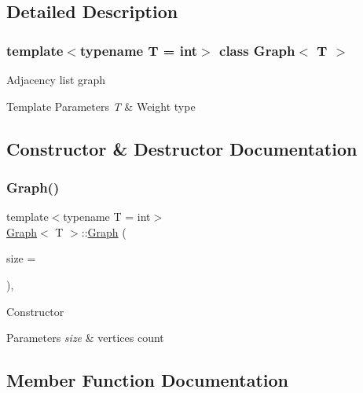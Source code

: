 \subsection{Detailed Description}
\subsubsection*{template$<$typename T = int$>$\newline
class Graph$<$ T $>$}

Adjacency list graph 
\begin{DoxyTemplParams}{Template Parameters}
{\em T} & Weight type \\
\hline
\end{DoxyTemplParams}


\subsection{Constructor \& Destructor Documentation}
\mbox{\label{class_graph_ae4d33378f071400af20f374d03a2ae17}} 
\subsubsection{\texorpdfstring{Graph()}{Graph()}}
{\footnotesize\ttfamily template$<$typename T = int$>$ \\
\hyperlink{class_graph}{Graph}$<$ T $>$\+::\hyperlink{class_graph}{Graph} (\begin{DoxyParamCaption}\item[{size\+\_\+t}]{size = {} }\end{DoxyParamCaption})\hspace{0.3cm}{\ttfamily [inline]}, {\ttfamily [explicit]}}

Constructor 
\begin{DoxyParams}{Parameters}
{\em size} & vertices count \\
\hline
\end{DoxyParams}


\subsection{Member Function Documentation}
\mbox{\label{class_graph_a8c2e51b9add82f2faa9979b24702832b}} 
